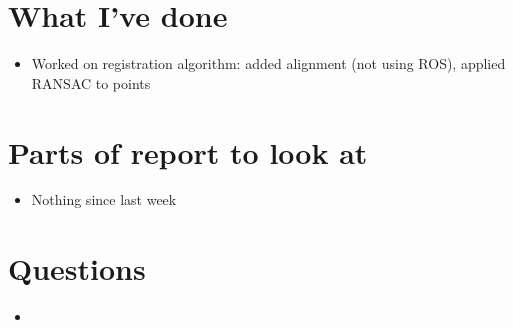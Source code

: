 \documentclass[12pt,a4paper]{article}
\begin{document}
\author{Katrina Ashton}


\pagestyle{fancy}
\fancyhf{}
\rhead{\thepage}

\section{What I've done}
\begin{itemize}
\item Worked on registration algorithm: added alignment (not using ROS), applied RANSAC to points
\end{itemize}

\section{Parts of report to look at}
\begin{itemize}
\item Nothing since last week
\end{itemize}

\section{Questions}
\begin{itemize}
\item
\end{itemize}
\end{document}
